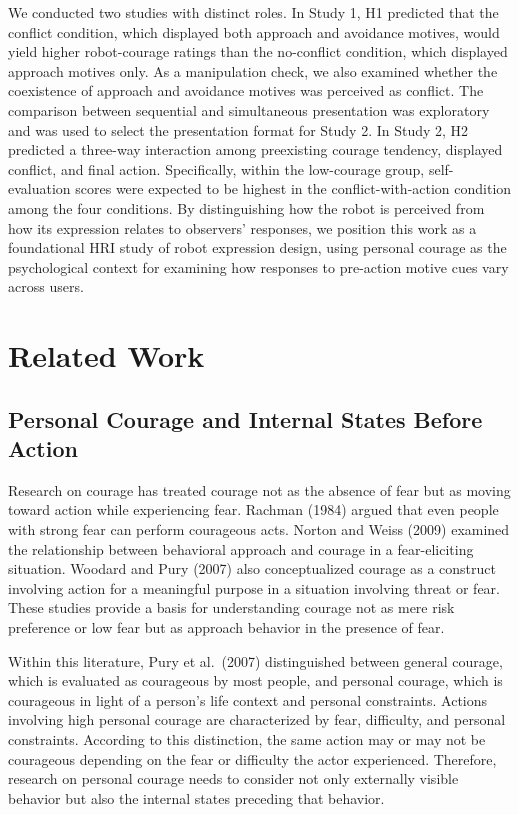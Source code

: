 \documentclass[utf8]{FrontiersinHarvard}
\begin{document}
We conducted two studies with distinct roles. In Study 1, H1 predicted that the conflict condition, which displayed both approach and avoidance motives, would yield higher robot-courage ratings than the no-conflict condition, which displayed approach motives only. As a manipulation check, we also examined whether the coexistence of approach and avoidance motives was perceived as conflict. The comparison between sequential and simultaneous presentation was exploratory and was used to select the presentation format for Study 2. In Study 2, H2 predicted a three-way interaction among preexisting courage tendency, displayed conflict, and final action. Specifically, within the low-courage group, self-evaluation scores were expected to be highest in the conflict-with-action condition among the four conditions. By distinguishing how the robot is perceived from how its expression relates to observers' responses, we position this work as a foundational HRI study of robot expression design, using personal courage as the psychological context for examining how responses to pre-action motive cues vary across users.

\section{Related Work}\label{related-work}

\subsection{Personal Courage and Internal States Before Action}\label{personal-courage-and-internal-states-before-action}

Research on courage has treated courage not as the absence of fear but as moving toward action while experiencing fear. Rachman (1984) argued that even people with strong fear can perform courageous acts. Norton and Weiss (2009) examined the relationship between behavioral approach and courage in a fear-eliciting situation. Woodard and Pury (2007) also conceptualized courage as a construct involving action for a meaningful purpose in a situation involving threat or fear. These studies provide a basis for understanding courage not as mere risk preference or low fear but as approach behavior in the presence of fear.

Within this literature, Pury et al.~(2007) distinguished between general courage, which is evaluated as courageous by most people, and personal courage, which is courageous in light of a person's life context and personal constraints. Actions involving high personal courage are characterized by fear, difficulty, and personal constraints. According to this distinction, the same action may or may not be courageous depending on the fear or difficulty the actor experienced. Therefore, research on personal courage needs to consider not only externally visible behavior but also the internal states preceding that behavior.
\end{document}
